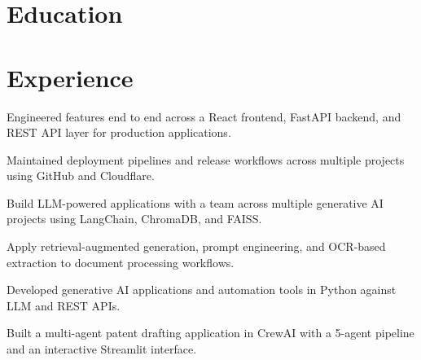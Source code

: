 \documentclass[a4paper,10pt]{article}
\begin{document}

\section{Education}
\eduschool

\section{Experience}

\begin{points}
  \item Engineered features end to end across a React frontend, FastAPI backend, and REST API layer for production applications.
  \item Maintained deployment pipelines and release workflows across multiple projects using GitHub and Cloudflare.
\end{points}
\gap

\begin{points}
  \item Build LLM-powered applications with a team across multiple generative AI projects using LangChain, ChromaDB, and FAISS.
  \item Apply retrieval-augmented generation, prompt engineering, and OCR-based extraction to document processing workflows.
\end{points}
\gap

\begin{points}
  \item Developed generative AI applications and automation tools in Python against LLM and REST APIs.
\end{points}
\gap

\begin{points}
  \item Built a multi-agent patent drafting application in CrewAI with a 5-agent pipeline and an interactive Streamlit interface.
\end{points}
\gap
\end{document}

